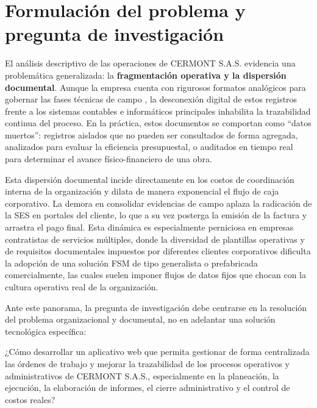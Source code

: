 \section{Formulación del problema y pregunta de investigación}
\label{sec:formulacion-problema}

El análisis descriptivo de las operaciones de CERMONT S.A.S. evidencia una problemática generalizada: la \textbf{fragmentación operativa y la dispersión documental}. Aunque la empresa cuenta con rigurosos formatos analógicos para gobernar las fases técnicas de campo \cite{formato_planeacion, formato_lineas_vida, formato_cctv}, la desconexión digital de estos registros frente a los sistemas contables e informáticos principales inhabilita la trazabilidad continua del proceso. En la práctica, estos documentos se comportan como ``datos muertos'': registros aislados que no pueden ser consultados de forma agregada, analizados para evaluar la eficiencia presupuestal, o auditados en tiempo real para determinar el avance físico-financiero de una obra.

Esta dispersión documental incide directamente en los costos de coordinación interna de la organización y dilata de manera exponencial el flujo de caja corporativo. La demora en consolidar evidencias de campo aplaza la radicación de la SES en portales del cliente, lo que a su vez posterga la emisión de la factura y arrastra el pago final. Esta dinámica es especialmente perniciosa en empresas contratistas de servicios múltiples, donde la diversidad de plantillas operativas y de requisitos documentales impuestos por diferentes clientes corporativos dificulta la adopción de una solución FSM de tipo generalista o prefabricada comercialmente, las cuales suelen imponer flujos de datos fijos que chocan con la cultura operativa real de la organización.

Ante este panorama, la pregunta de investigación debe centrarse en la resolución del problema organizacional y documental, no en adelantar una solución tecnológica específica:

\begin{tcolorbox}[colback=institucionalGrey!35,colframe=institucionalBlue,title=Pregunta de Investigación]
    ¿Cómo desarrollar un aplicativo web que permita gestionar de forma centralizada las órdenes de trabajo y mejorar la trazabilidad de los procesos operativos y administrativos de CERMONT S.A.S., especialmente en la planeación, la ejecución, la elaboración de informes, el cierre administrativo y el control de costos reales?
\end{tcolorbox}

